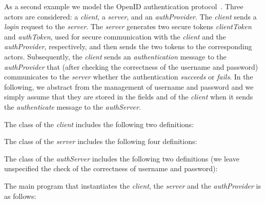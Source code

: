 \documentclass{LMCS}
\theoremstyle{plain}\newtheorem{proposition}[thm]{Proposition}
\theoremstyle{plain}\newtheorem{lemma}[thm]{Lemma}
\theoremstyle{plain}\newtheorem{theorem}[thm]{Theorem}
\theoremstyle{plain}\newtheorem{corollary}[thm]{Corollary}
\newif\ifconf \conffalse
\begin{document}
\ifconf
\else
\begin{exa}
\newcommand{\username}{{\tt username}}
\newcommand{\password}{{\tt password}}
\newcommand{\auth}{{\tt auth}}
\newcommand{\ctoken}{{\tt ctoken}}
\newcommand{\atoken}{{\tt atoken}}
\newcommand{\server}{{\tt server}}
\newcommand{\sfield}{{\tt server}}
As a second example we model the
OpenID authentication protocol~\cite{openID}.
Three actors are considered: a {\it client}, a {\it server},
and an {\it  authProvider}.
The {\it client} sends a {\it login} request to the {\it server}.
The {\it server} generates two secure tokens {\it clientToken}
and {\it authToken}, used for secure communication with the 
{\it client} and the {\it  authProvider}, respectively,
and then sends the two tokens to the corresponding actors.
Subsequently, the {\it client} sends an {\em authentication}
message to the {\it  authProvider} that (after
checking the correctness of the username and password)
communicates to the {\it server} whether the authentication
{\it succeeds} or {\it fails}.
In the following, we abstract from the management of username
and password and we simply assume that they are stored in the
fields  and  of the {\it client} 
when it sends the {\it authenticate} message
to the {\it authServer}.

The class  of the {\it client}
includes the following two definitions:


The class  of the {\it server}
includes the following four definitions:


The class  of the {\it authServer}
includes the following two definitions (we leave unspecified
the check of the correctness of username and password):



The main program that instantiates the {\it client},
the {\it server} and the {\it authProvider} is as follows:

\end{exa}
\end{document}
